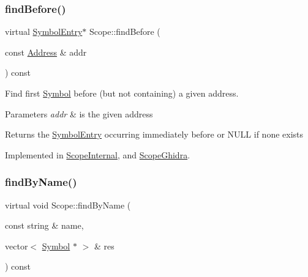 \mbox{\label{class_scope_a1c2e83ba66c61b449d85b492b1539625}} 
\subsubsection{\texorpdfstring{findBefore()}{findBefore()}}
{\footnotesize\ttfamily virtual \mbox{\hyperlink{class_symbol_entry}{Symbol\+Entry}}$\ast$ Scope\+::find\+Before (\begin{DoxyParamCaption}\item[{const \mbox{\hyperlink{class_address}{Address}} \&}]{addr }\end{DoxyParamCaption}) const\hspace{0.3cm}{\ttfamily [pure virtual]}}



Find first \mbox{\hyperlink{class_symbol}{Symbol}} before (but not containing) a given address. 


\begin{DoxyParams}{Parameters}
{\em addr} & is the given address \\
\hline
\end{DoxyParams}
\begin{DoxyReturn}{Returns}
the \mbox{\hyperlink{class_symbol_entry}{Symbol\+Entry}} occurring immediately before or N\+U\+LL if none exists 
\end{DoxyReturn}


Implemented in \mbox{\hyperlink{class_scope_internal_a28ae6dd136a8b285c667206417ec14a5}{Scope\+Internal}}, and \mbox{\hyperlink{class_scope_ghidra_a2a7be1b0ee6c1c51d04bb5ae0ea0b721}{Scope\+Ghidra}}.

\mbox{\label{class_scope_a979222d28577e6e8d07e35f12d38bff7}} 
\subsubsection{\texorpdfstring{findByName()}{findByName()}}
{\footnotesize\ttfamily virtual void Scope\+::find\+By\+Name (\begin{DoxyParamCaption}\item[{const string \&}]{name,  }\item[{vector$<$ \mbox{\hyperlink{class_symbol}{Symbol}} $\ast$ $>$ \&}]{res }\end{DoxyParamCaption}) const\hspace{0.3cm}{\ttfamily [pure virtual]}}




